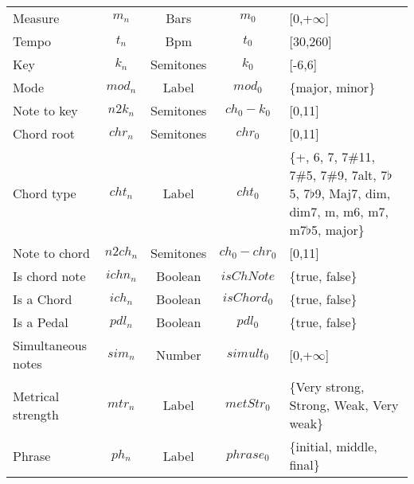\begin{table}
{\begin{tabular}{l c c c p{2.5cm} }
    Measure & $m_n$ & Bars & $m_0$ & [0,+$\infty$] \\
    Tempo & $t_n$ & Bpm & $t_0$ & [30,260] \\
    Key & $k_n$ & Semitones & $k_0$ & [-6,6] \\
 	Mode & $mod_n$ & Label & $mod_0$ & \{major, minor\} \\
  	Note to key & $n2k_n$ & Semitones & $ch_0-k_0$ & [0,11] \\
 	Chord root & $chr_n$ & Semitones & $chr_0$ & [0,11] \\
    Chord type & $cht_n$ & Label & $cht_0$  & \{+, 6, 7, 7\#11, 7\#5, 7\#9, 7alt, 7$\flat$5, 7$\flat$9, Maj7, dim, dim7, m, m6, m7, m7$\flat$5, major\} \\
	Note to chord & $n2ch_n$ & Semitones & $ch_0-chr_0$ & [0,11] \\
 	Is chord note & $ichn_n$ & Boolean & $isChNote$ & \{true, false\} \\
    Is a Chord & $ich_n$ & Boolean & $isChord_0$ & \{true, false\} \\
    Is a Pedal & $pdl_n$ & Boolean & $pdl_0$ & \{true, false\} \\
    Simultaneous notes & $sim_n$ & Number & $simult_0$ & [0,+$\infty$] \\
 	Metrical strength & $mtr_n$ & Label & $metStr_0$ & \{Very strong, Strong, Weak, Very weak\} \\
 	Phrase & $ph_n$ & Label & $phrase_0$ & \{initial, middle, final\} \\
 

    \hline

  \end{tabular}
  }
\end{table}
